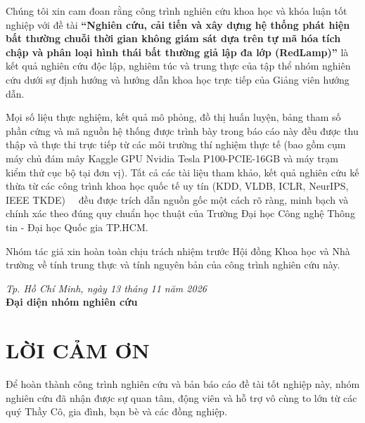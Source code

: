 \documentclass[11pt,journal,onecolumn]{IEEEtran}
\begin{document}
Chúng tôi xin cam đoan rằng công trình nghiên cứu khoa học và khóa luận tốt nghiệp với đề tài \textbf{``Nghiên cứu, cải tiến và xây dựng hệ thống phát hiện bất thường chuỗi thời gian không giám sát dựa trên tự mã hóa tích chập và phân loại hình thái bất thường giả lập đa lớp (RedLamp)''} là kết quả nghiên cứu độc lập, nghiêm túc và trung thực của tập thể nhóm nghiên cứu dưới sự định hướng và hướng dẫn khoa học trực tiếp của Giảng viên hướng dẫn.

Mọi số liệu thực nghiệm, kết quả mô phỏng, đồ thị huấn luyện, bảng tham số phần cứng và mã nguồn hệ thống được trình bày trong báo cáo này đều được thu thập và thực thi trực tiếp từ các môi trường thí nghiệm thực tế (bao gồm cụm máy chủ đám mây Kaggle GPU Nvidia Tesla P100-PCIE-16GB và máy trạm kiểm thử cục bộ tại đơn vị). Tất cả các tài liệu tham khảo, kết quả nghiên cứu kế thừa từ các công trình khoa học quốc tế uy tín (KDD, VLDB, ICLR, NeurIPS, IEEE TKDE)~\cite{paparrizos2022tsb,su2019robust,xu2022anomaly,tatbul2018precision}~\cite{paparrizos2022tsb,su2019robust,xu2022anomaly,tatbul2018precision} đều được trích dẫn nguồn gốc một cách rõ ràng, minh bạch và chính xác theo đúng quy chuẩn học thuật của Trường Đại học Công nghệ Thông tin - Đại học Quốc gia TP.HCM.

Nhóm tác giả xin hoàn toàn chịu trách nhiệm trước Hội đồng Khoa học và Nhà trường về tính trung thực và tính nguyên bản của công trình nghiên cứu này.

\vspace{1.5cm}
\begin{flushright}
    \textit{Tp. Hồ Chí Minh, ngày 13 tháng 11 năm 2026}\\
    \textbf{Đại diện nhóm nghiên cứu}\\
    \vspace{1.0cm}
    \underline{\hspace{6.0cm}}
\end{flushright}

\newpage

\section*{LỜI CẢM ƠN}

Để hoàn thành công trình nghiên cứu và bản báo cáo đề tài tốt nghiệp này, nhóm nghiên cứu đã nhận được sự quan tâm, động viên và hỗ trợ vô cùng to lớn từ các quý Thầy Cô, gia đình, bạn bè và các đồng nghiệp.
\end{document}
